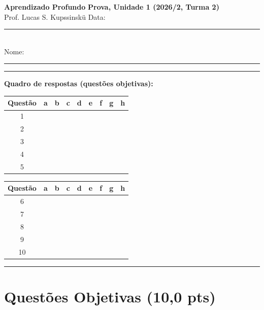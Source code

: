 \documentclass[11pt,a4paper]{article}
\renewcommand{\arraystretch}{1.4}
\begin{document}
{\Large\bfseries Aprendizado Profundo} \hfill \textbf{Prova, Unidade 1 (2026/2, Turma 2)}\\
Prof. Lucas S. Kupssinskü \hfill Data: \rule{3cm}{0.4pt}\\[0.4em]
Nome: \rule{12cm}{0.4pt}

\rule{\linewidth}{0.8pt}

\textbf{Quadro de respostas (questões objetivas):}\\[0.2em]
\begin{center}
{\renewcommand{\arraystretch}{1.15}
\begin{tabular}{|c|c|c|c|c|c|c|c|c|}
\hline
\textbf{Questão} & \textbf{a} & \textbf{b} & \textbf{c} & \textbf{d} & \textbf{e} & \textbf{f} & \textbf{g} & \textbf{h} \\\hline
1 & & & & & & & & \\\hline
2 & & & & & & & & \\\hline
3 & & & & & & & & \\\hline
4 & & & & & & & & \\\hline
5 & & & & & & & & \\\hline
\end{tabular}
\hspace{1.2em}
\begin{tabular}{|c|c|c|c|c|c|c|c|c|}
\hline
\textbf{Questão} & \textbf{a} & \textbf{b} & \textbf{c} & \textbf{d} & \textbf{e} & \textbf{f} & \textbf{g} & \textbf{h} \\\hline
6 & & & & & & & & \\\hline
7 & & & & & & & & \\\hline
8 & & & & & & & & \\\hline
9 & & & & & & & & \\\hline
10 & & & & & & & & \\\hline
\end{tabular}}
\end{center}

\rule{\linewidth}{0.4pt}

\section*{Questões Objetivas (10{,}0 pts)}
\end{document}
